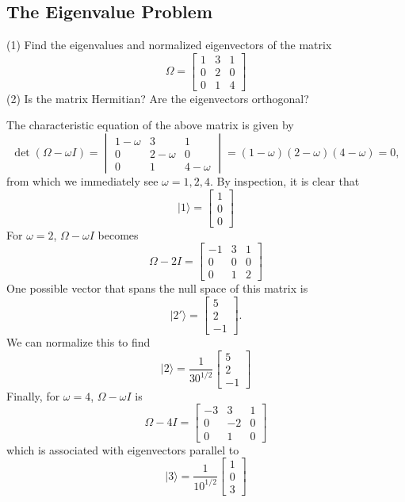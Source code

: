 \documentclass[../principles-of-quantum-mechanics.tex]{subfiles}
\begin{document}
\begin{questions}
\setcounter{subsection}{7}
\setcounter{question}{0}
\subsection{The Eigenvalue Problem}
\question (1) Find the eigenvalues and normalized eigenvectors of the matrix
\[
	\Omega = \begin{bmatrix}1 & 3 & 1 \\ 0 & 2 & 0 \\ 0 & 1 & 4\end{bmatrix}
\]
(2) Is the matrix Hermitian? Are the eigenvectors orthogonal?

\begin{solution}
		The characteristic equation of the above matrix is given by
		\[
			\det(\Omega - \omega{I})=\begin{vmatrix}1 - \omega & 3 & 1 \\ 0 & 2 - \omega & 0 \\ 0 & 1 & 4 - \omega\end{vmatrix} = (1-\omega)(2-\omega)(4-\omega) = 0,
		\]
		from which we immediately see $\omega=1, 2, 4$. By inspection, it is clear that \\
		\[
			|1\rangle=\begin{bmatrix}1 \\ 0 \\ 0\end{bmatrix}
		\]
		For $\omega = 2$, $\Omega-\omega{I}$ becomes
		\[
			\Omega - 2I = \begin{bmatrix}-1 & 3 & 1 \\ 0 & 0 & 0 \\ 0 & 1 & 2\end{bmatrix}
		\]
		One possible vector that spans the null space of this matrix is
		\[
			|2'\rangle = \begin{bmatrix}5 \\ 2 \\ -1\end{bmatrix}.
		\]
		We can normalize this to find
		\[
			|2\rangle = \frac{1}{30^{1/2}}\begin{bmatrix}5 \\ 2 \\ -1\end{bmatrix}
		\]
		Finally, for $\omega=4$, $\Omega - \omega{I}$ is
		\[
			\Omega - 4I = \begin{bmatrix}-3 & 3 & 1 \\ 0 & -2 & 0 \\ 0 & 1 & 0\end{bmatrix}
		\]
		which is associated with eigenvectors parallel to
		\[
			|3\rangle = \frac{1}{10^{1/2}}\begin{bmatrix}1 \\ 0 \\ 3\end{bmatrix}
		\]
		

\end{solution}
\end{questions}
\end{document}

